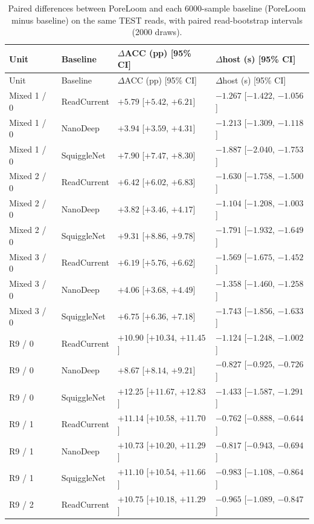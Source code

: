 \begin{longtable}{llll}
\caption{Paired differences between PoreLoom and each 6000-sample baseline (PoreLoom minus baseline) on the same TEST reads, with paired read-bootstrap intervals (2000 draws).}\label{tab:s_main_paired}\\
\toprule
Unit & Baseline & $\Delta$ACC (pp) [95\% CI] & $\Delta$host (s) [95\% CI]\\\midrule\endfirsthead
\toprule
Unit & Baseline & $\Delta$ACC (pp) [95\% CI] & $\Delta$host (s) [95\% CI]\\\midrule\endhead
\bottomrule\endfoot
Mixed 1 / 0 & ReadCurrent & $+5.79$ [$+5.42$, $+6.21$] & $-1.267$ [$-1.422$, $-1.056$]\\
Mixed 1 / 0 & NanoDeep & $+3.94$ [$+3.59$, $+4.31$] & $-1.213$ [$-1.309$, $-1.118$]\\
Mixed 1 / 0 & SquiggleNet & $+7.90$ [$+7.47$, $+8.30$] & $-1.887$ [$-2.040$, $-1.753$]\\
Mixed 2 / 0 & ReadCurrent & $+6.42$ [$+6.02$, $+6.83$] & $-1.630$ [$-1.758$, $-1.500$]\\
Mixed 2 / 0 & NanoDeep & $+3.82$ [$+3.46$, $+4.17$] & $-1.104$ [$-1.208$, $-1.003$]\\
Mixed 2 / 0 & SquiggleNet & $+9.31$ [$+8.86$, $+9.78$] & $-1.791$ [$-1.932$, $-1.649$]\\
Mixed 3 / 0 & ReadCurrent & $+6.19$ [$+5.76$, $+6.62$] & $-1.569$ [$-1.675$, $-1.452$]\\
Mixed 3 / 0 & NanoDeep & $+4.06$ [$+3.68$, $+4.49$] & $-1.358$ [$-1.460$, $-1.258$]\\
Mixed 3 / 0 & SquiggleNet & $+6.75$ [$+6.36$, $+7.18$] & $-1.743$ [$-1.856$, $-1.633$]\\
R9 / 0 & ReadCurrent & $+10.90$ [$+10.34$, $+11.45$] & $-1.124$ [$-1.248$, $-1.002$]\\
R9 / 0 & NanoDeep & $+8.67$ [$+8.14$, $+9.21$] & $-0.827$ [$-0.925$, $-0.726$]\\
R9 / 0 & SquiggleNet & $+12.25$ [$+11.67$, $+12.83$] & $-1.433$ [$-1.587$, $-1.291$]\\
R9 / 1 & ReadCurrent & $+11.14$ [$+10.58$, $+11.70$] & $-0.762$ [$-0.888$, $-0.644$]\\
R9 / 1 & NanoDeep & $+10.73$ [$+10.20$, $+11.29$] & $-0.817$ [$-0.943$, $-0.694$]\\
R9 / 1 & SquiggleNet & $+11.10$ [$+10.54$, $+11.66$] & $-0.983$ [$-1.108$, $-0.864$]\\
R9 / 2 & ReadCurrent & $+10.75$ [$+10.18$, $+11.29$] & $-0.965$ [$-1.089$, $-0.847$]\\

\end{longtable}
